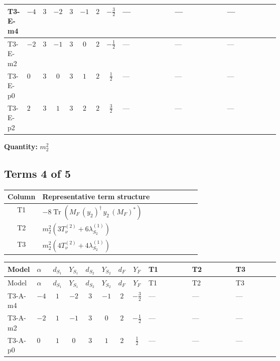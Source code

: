 \documentclass[8pt]{article}
\begin{document}
\begin{landscape}
\begin{longtable}{@{}llcccccc >{\raggedright\arraybackslash}p{0.21\linewidth} >{\raggedright\arraybackslash}p{0.21\linewidth} >{\raggedright\arraybackslash}p{0.21\linewidth}@{}}
\midrule
T3-E-m4 & $-4$ & $3$ & $-2$ & $3$ & $-1$ & $2$ & $-\frac{3}{2}$ & --- & --- & --- \\
\midrule
T3-E-m2 & $-2$ & $3$ & $-1$ & $3$ & $0$ & $2$ & $-\frac{1}{2}$ & --- & --- & --- \\
\midrule
T3-E-p0 & $0$ & $3$ & $0$ & $3$ & $1$ & $2$ & $\frac{1}{2}$ & --- & --- & --- \\
\midrule
T3-E-p2 & $2$ & $3$ & $1$ & $3$ & $2$ & $2$ & $\frac{3}{2}$ & --- & --- & --- \\
\midrule
\bottomrule
\end{longtable}
\clearpage
\noindent\textbf{Quantity: }$m_2^2$\par\smallskip
\subsection*{Terms 4 of 5}
\begin{center}
\begin{tabular}{@{}c >{\raggedright\arraybackslash}p{0.82\linewidth}@{}}
\toprule
Column & Representative term structure \\
\midrule
T1 & \(\displaystyle -8 \operatorname{Tr}\!\left({M_F}\,\left({y_2}\right)^{\dagger}\,{y_2}\,\left({M_F}\right)^{*}\right)\) \\
\midrule
T2 & \(\displaystyle {m_2^2} (3 T_{\nu}^{(2)}+6 {\lambda_{S_2}^{(1)}})\) \\
\midrule
T3 & \(\displaystyle {m_2^2} (4 T_{\nu}^{(2)}+4 {\lambda_{S_2}^{(1)}})\) \\
\midrule
\bottomrule
\end{tabular}
\end{center}
\smallskip
\tiny
\begin{longtable}{@{}llcccccc >{\raggedright\arraybackslash}p{0.21\linewidth} >{\raggedright\arraybackslash}p{0.21\linewidth} >{\raggedright\arraybackslash}p{0.21\linewidth}@{}}
\toprule
Model & $\alpha$ & $d_{S_1}$ & $Y_{S_1}$ & $d_{S_2}$ & $Y_{S_2}$ & $d_F$ & $Y_F$ & T1 & T2 & T3 \\
\midrule
\endfirsthead
\toprule
Model & $\alpha$ & $d_{S_1}$ & $Y_{S_1}$ & $d_{S_2}$ & $Y_{S_2}$ & $d_F$ & $Y_F$ & T1 & T2 & T3 \\
\midrule
\endhead
T3-A-m4 & $-4$ & $1$ & $-2$ & $3$ & $-1$ & $2$ & $-\frac{3}{2}$ & --- & --- & --- \\
\midrule
T3-A-m2 & $-2$ & $1$ & $-1$ & $3$ & $0$ & $2$ & $-\frac{1}{2}$ & --- & --- & --- \\
\midrule
T3-A-p0 & $0$ & $1$ & $0$ & $3$ & $1$ & $2$ & $\frac{1}{2}$ & --- & --- & --- \\

\end{longtable}
\end{landscape}
\end{document}

